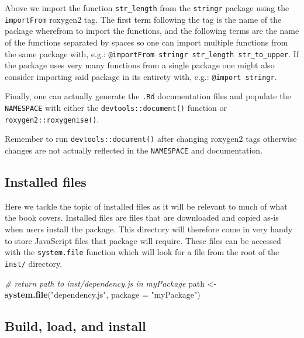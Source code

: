 \documentclass[
]{krantz}
\makeatletter
\newenvironment{Shaded}{\begin{snugshade}}{\end{snugshade}}
\newcommand{\CommentTok}[1]{\textcolor[rgb]{0.37,0.37,0.37}{\textit{#1}}}
\newcommand{\DataTypeTok}[1]{\textcolor[rgb]{0.27,0.27,0.27}{#1}}
\newcommand{\KeywordTok}[1]{\textcolor[rgb]{0.27,0.27,0.27}{\textbf{#1}}}
\newcommand{\NormalTok}[1]{#1}
\newcommand{\StringTok}[1]{\textcolor[rgb]{0.5,0.5,0.5}{#1}}
\newenvironment{kframe}{%
\medskip{}
\setlength{\fboxsep}{.8em}
 \def\at@end@of@kframe{}%
 \ifinner\ifhmode%
  \def\at@end@of@kframe{\end{minipage}}%
  \begin{minipage}{\columnwidth}%
 \fi\fi%
 \def\FrameCommand##1{\hskip\@totalleftmargin \hskip-\fboxsep
 \colorbox{shadecolor}{##1}\hskip-\fboxsep
     \hskip-\linewidth \hskip-\@totalleftmargin \hskip\columnwidth}%
 \MakeFramed {\advance\hsize-\width
   \@totalleftmargin\z@ \linewidth\hsize
   \@setminipage}}%
 {\par\unskip\endMakeFramed%
 \at@end@of@kframe}
\renewenvironment{Shaded}{\begin{kframe}}{\end{kframe}}
\newenvironment{rmdblock}[1]
  {
  \begin{itemize}
  \renewcommand{\labelitemi}{
    \raisebox{-.7\height}[0pt][0pt]{
      {\setkeys{Gin}{width=3em,keepaspectratio}\texttt{[image: images/\#1]}}
    }
  }
  \setlength{\fboxsep}{1em}
  \begin{kframe}
  \item
  }
  {
  \end{kframe}
  \end{itemize}
  }
\newenvironment{rmdnote}
  {\begin{rmdblock}{note}}
  {\end{rmdblock}}
\makeatother
\begin{document}
Above we import the function \texttt{str\_length} from the \texttt{stringr} package using the \texttt{importFrom} roxygen2 tag. The first term following the tag is the name of the package wherefrom to import the functions, and the following terms are the name of the functions separated by spaces so one can import multiple functions from the same package with, e.g.: \texttt{@importFrom\ stringr\ str\_length\ str\_to\_upper}. If the package uses very many functions from a single package one might also consider importing said package in its entirety with, e.g.: \texttt{@import\ stringr}.

Finally, one can actually generate the \texttt{.Rd} documentation files and populate the \texttt{NAMESPACE} with either the \texttt{devtools::document()} function or \texttt{roxygen2::roxygenise()}.

\begin{rmdnote}
Remember to run \texttt{devtools::document()} after changing roxygen2
tags otherwise changes are not actually reflected in the
\texttt{NAMESPACE} and documentation.
\end{rmdnote}

\hypertarget{basics-installed-files}{%
\subsection{Installed files}\label{basics-installed-files}}

Here we tackle the topic of installed files as it will be relevant to much of what the book covers. Installed files are files that are downloaded and copied as-is when users install the package. This directory will therefore come in very handy to store JavaScript files that package will require. These files can be accessed with the \texttt{system.file} function which will look for a file from the root of the \texttt{inst/} directory.

\begin{Shaded}
\begin{Highlighting}[]
\CommentTok{\# return path to \textasciigrave{}inst/dependency.js\textasciigrave{} in \textasciigrave{}myPackage\textasciigrave{}}
\NormalTok{path <{-}}\StringTok{ }\KeywordTok{system.file}\NormalTok{(}\StringTok{"dependency.js"}\NormalTok{, }\DataTypeTok{package =} \StringTok{"myPackage"}\NormalTok{)}
\end{Highlighting}
\end{Shaded}

\hypertarget{basics-build-load-install}{%
\subsection{Build, load, and install}\label{basics-build-load-install}}
\end{document}
